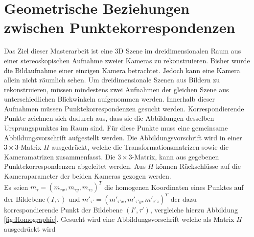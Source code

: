 \chapter{Geometrische Beziehungen zwischen Punktekorrespondenzen}
\label{sec:HFE}

Das Ziel dieser Masterarbeit ist eine 3D Szene im dreidimensionalen Raum aus einer stereoskopischen Aufnahme zweier Kameras zu rekonstruieren. Bisher wurde die Bildaufnahme einer einzigen Kamera betrachtet. Jedoch kann eine Kamera allein nicht räumlich sehen. Um dreidimensionale Szenen aus Bildern zu rekonstruieren, müssen mindestens zwei Aufnahmen der gleichen Szene aus unterschiedlichen Blickwinkeln aufgenommen werden. Innerhalb dieser Aufnahmen müssen Punktekorrespondenzen gesucht werden. Korrespondierende Punkte zeichnen sich dadurch aus, dass sie die Abbildungen desselben Ursprungspunktes im Raum sind. Für diese Punkte muss eine gemeinsame Abbildungsvorschrift aufgestellt werden. Die Abbildungsvorschrift wird in einer $3 \times 3$-Matrix $H$ ausgedrückt, welche die Transformationsmatrizen sowie die Kameramatrizen zusammenfasst. Die $3 \times 3$-Matrix, kann aus gegebenen Punktekorrespondenzen abgeleitet werden. Aus $H$ können Rückschlüsse auf die Kameraparameter der beiden Kameras gezogen werden.  \\


%

Es seien \ensuremath{m_{\tau} =(m_{\tau x},m_{\tau y},m_{\tau z})^T} die homogenen Koordinaten eines Punktes auf der Bildebene$(I,\tau)$ und \ensuremath{m'_{\tau'} = (m'_{\tau'x},m'_{\tau'y},m'_{\tau'z})^T} der dazu korrespondierende Punkt der Bildebene $(I',\tau')$, vergleiche hierzu Abbildung \ref{fig:Homographie}. Gesucht wird eine Abbildungsvorschrift welche als Matrix $H$ ausgedrückt wird

